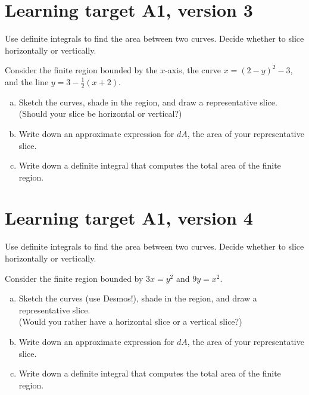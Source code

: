 \pagebreak 
\section{Learning target A1, version 3}

Use definite integrals to find the area between two curves. Decide whether to slice horizontally or vertically.

\hrulefill

Consider the finite region bounded by the $x$-axis, the curve $x=(2-y)^2-3$, \\
and the line $y = 3-\frac{1}{2}(x+2)$.

\begin{enumerate}[(a)]
	\item Sketch the curves, shade in the region, and draw a representative slice. \\
	(Should your slice be horizontal or vertical?)
	\vfill
	\item Write down an approximate expression for $dA$, the area of your representative slice.
	\vfill
	\item Write down a definite integral that computes the total area of the finite region.
	\vfill
\end{enumerate}

\pagebreak 
\section{Learning target A1, version 4}

Use definite integrals to find the area between two curves. Decide whether to slice horizontally or vertically.

\hrulefill

Consider the finite region bounded by $3x = y^2$ and $9y=x^2$.

\begin{enumerate}[(a)]
	\item Sketch the curves (use Desmos!), shade in the region, and draw a representative slice. \\
	(Would you rather have a horizontal slice or a vertical slice?)
	\vfill
	\item Write down an approximate expression for $dA$, the area of your representative slice.
	\vfill
	\item Write down a definite integral that computes the total area of the finite region.
	\vfill
\end{enumerate}

